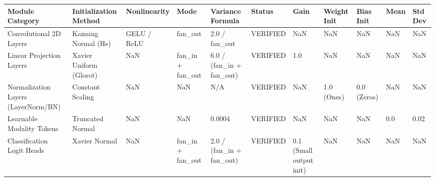 \begin{tabular}{lllllllllll}
\toprule
Module Category & Initialization Method & Nonlinearity & Mode & Variance Formula & Status & Gain & Weight Init & Bias Init & Mean & Std Dev \\
\midrule
Convolutional 2D Layers & Kaiming Normal (He) & GELU / ReLU & fan\_out & 2.0 / fan\_out & VERIFIED & NaN & NaN & NaN & NaN & NaN \\
Linear Projection Layers & Xavier Uniform (Glorot) & NaN & fan\_in + fan\_out & 6.0 / (fan\_in + fan\_out) & VERIFIED & 1.0 & NaN & NaN & NaN & NaN \\
Normalization Layers (LayerNorm/BN) & Constant Scaling & NaN & NaN & N/A & VERIFIED & NaN & 1.0 (Ones) & 0.0 (Zeros) & NaN & NaN \\
Learnable Modality Tokens & Truncated Normal & NaN & NaN & 0.0004 & VERIFIED & NaN & NaN & NaN & 0.0 & 0.02 \\
Classification Logit Heads & Xavier Normal & NaN & fan\_in + fan\_out & 2.0 / (fan\_in + fan\_out) & VERIFIED & 0.1 (Small output init) & NaN & NaN & NaN & NaN \\
\bottomrule
\end{tabular}
